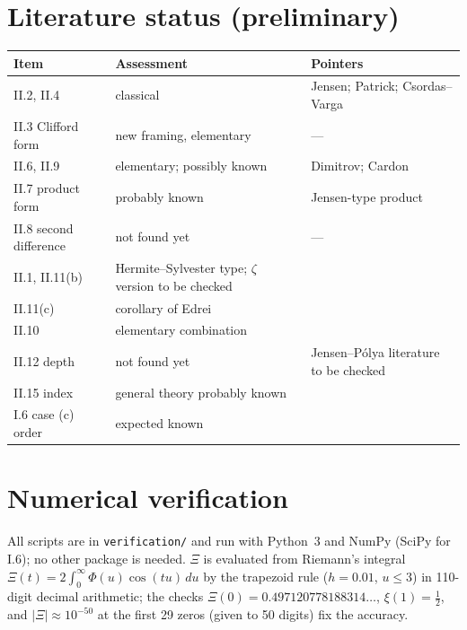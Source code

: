 \documentclass[11pt]{amsart}
\theoremstyle{plain}
\theoremstyle{definition}
\begin{document}
\section{Literature status (preliminary)}\label{sec:literature}

\begin{longtable}{>{\raggedright\arraybackslash}p{3.4cm}>{\raggedright\arraybackslash}p{3.6cm}>{\raggedright\arraybackslash}p{7cm}}
\toprule
Item & Assessment & Pointers\\ \midrule
II.2, II.4 & classical & Jensen; Patrick; Csordas--Varga \cite{CsordasVarga,Cardon}\\
II.3 Clifford form & new framing, elementary & ---\\
II.6, II.9 & elementary; possibly known & Dimitrov; Cardon \cite{Cardon}\\
II.7 product form & probably known & Jensen-type product\\
II.8 second difference & not found yet & ---\\
II.1, II.11(b) & Hermite--Sylvester type; $\zeta$ version to be checked & \cite{KreinNaimark,Yoshida}\\
II.11(c) & corollary of Edrei & \cite{Edrei,TPToeplitz}\\
II.10 & elementary combination & \cite{Li,BL}\\
II.12 depth & not found yet & Jensen--P\'olya literature to be checked \cite{GORZ}\\
II.15 index & general theory probably known & \cite{Stewart,KaltenbackWoracek}\\
I.6 case (c) order & expected known & \cite{SerraCapizzano,BottcherGrudsky}\\
\bottomrule
\end{longtable}

\section{Numerical verification}
All scripts are in \texttt{verification/} and run with Python~3 and NumPy (SciPy for I.6);
no other package is needed. $\Xi$ is evaluated from Riemann's integral
$\Xi(t)=2\int_0^\infty\Phi(u)\cos(tu)\,du$ by the trapezoid rule ($h=0.01$, $u\le3$) in
110-digit decimal arithmetic; the checks $\Xi(0)=0.497120778188314\ldots$, $\xi(1)=\frac12$,
and $|\Xi|\approx10^{-50}$ at the first 29 zeros (given to 50 digits) fix the accuracy.
\end{document}
